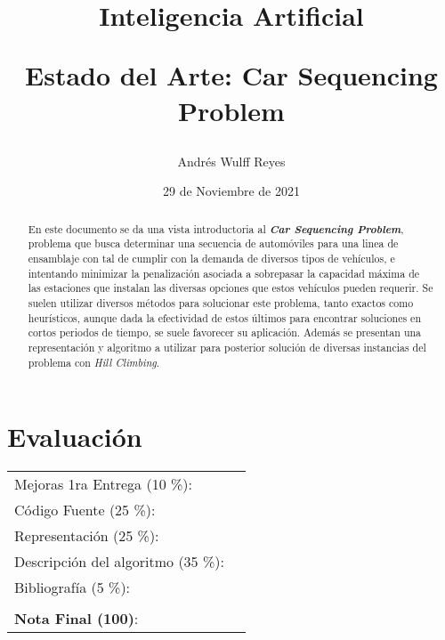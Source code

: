 \documentclass[letter, 10pt]{article}
\begin{document}
\title{Inteligencia Artificial \\ \begin{Large}Estado del Arte: Car Sequencing Problem\end{Large}}
\author{Andrés Wulff Reyes}
\date{29 de Noviembre de 2021}
\maketitle


\section*{Evaluación}

\begin{tabular}{ll}
Mejoras 1ra Entrega (10 \%): &  \underline{\hspace{2cm}}\\
C\'odigo Fuente (25 \%): &  \underline{\hspace{2cm}}\\
Representación (25 \%):  & \underline{\hspace{2cm}} \\
Descripción del algoritmo (35 \%):  & \underline{\hspace{2cm}} \\
Bibliografía (5 \%): & \underline{\hspace{2cm}}\\
 &  \\
\textbf{Nota Final (100)}:   & \underline{\hspace{2cm}}
\end{tabular}

\begin{abstract}
En este documento se da una vista introductoria al \textit{\textbf{Car Sequencing Problem}}, problema que busca determinar una secuencia de automóviles para una linea de ensamblaje con tal de cumplir con la demanda de diversos tipos de vehículos, e intentando minimizar la penalización asociada a sobrepasar la capacidad máxima de las estaciones que instalan las diversas opciones que estos vehículos pueden requerir. Se suelen utilizar diversos m\'etodos para solucionar este problema, tanto exactos como heurísticos, aunque dada la efectividad de estos últimos para encontrar soluciones en cortos periodos de tiempo, se suele favorecer su aplicación. Además se presentan una representación y algoritmo a utilizar para posterior solución de diversas instancias del problema con \textit{Hill Climbing}.
\end{abstract}
\end{document}

